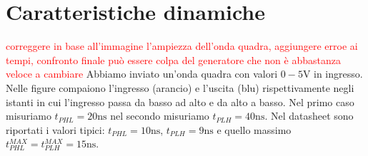 \documentclass[10pt,a4paper]{article}
\begin{document}
	\section{Caratteristiche dinamiche}
\textcolor{red}{correggere in base all'immagine l'ampiezza dell'onda quadra, aggiungere erroe ai tempi, confronto finale può essere colpa del generatore che non è abbastanza veloce a cambiare}
Abbiamo inviato un'onda quadra con valori  $0-5 \si{\volt}$ in ingresso. Nelle figure compaiono l'ingresso (arancio) e l'uscita (blu) rispettivamente negli istanti in cui l'ingresso passa da basso ad alto e da alto a basso.
Nel primo caso misuriamo $t_{PHL}= 20 \si{\nano\second}$ nel secondo  misuriamo $t_{PLH} = 40\si{\nano \second}$.
Nel datasheet sono riportati i valori tipici: $t_{PHL}= 10 \si{\nano\second}$, $t_{PLH} = 9\si{\nano \second}$ e quello massimo $t_{PHL}^{MAX}= t_{PLH}^{MAX}= 15 \si{\nano\second}$.
\end{document}
